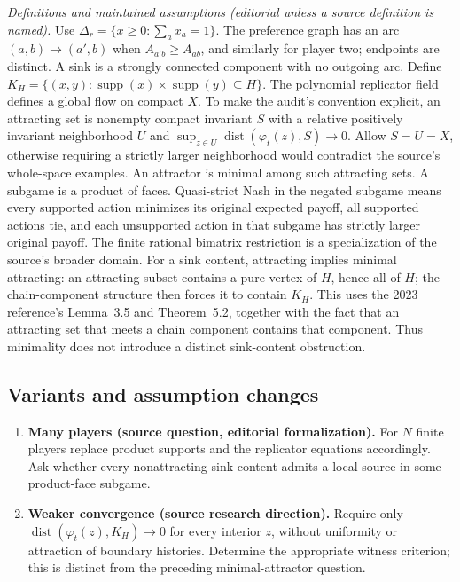 \documentclass[11pt,a4paper]{article}
\begin{document}
\emph{Definitions and maintained assumptions (editorial unless a source definition is named).} Use \(\Delta_r=\{x\ge0:\sum_a x_a=1\}\). The preference graph has an arc \((a,b)\to(a',b)\) when \(A_{a'b}\ge A_{ab}\), and similarly for player two; endpoints are distinct. A sink is a strongly connected component with no outgoing arc. Define \(K_H=\{(x,y):\operatorname{supp}(x)\times\operatorname{supp}(y)\subseteq H\}\). The polynomial replicator field defines a global flow on compact \(X\). To make the audit’s convention explicit, an attracting set is nonempty compact invariant \(S\) with a relative positively invariant neighborhood \(U\) and \(\sup_{z\in U}\operatorname{dist}(\varphi_t(z),S)\to0\). Allow \(S=U=X\), otherwise requiring a strictly larger neighborhood would contradict the source’s whole-space examples. An attractor is minimal among such attracting sets. A subgame is a product of faces. Quasi-strict Nash in the negated subgame means every supported action minimizes its original expected payoff, all supported actions tie, and each unsupported action in that subgame has strictly larger original payoff. The finite rational bimatrix restriction is a specialization of the source’s broader domain. For a sink content, attracting implies minimal attracting: an attracting subset contains a pure vertex of \(H\), hence all of \(H\); the chain-component structure then forces it to contain \(K_H\). This uses the 2023 reference's Lemma~3.5 and Theorem~5.2, together with the fact that an attracting set that meets a chain component contains that component. Thus minimality does not introduce a distinct sink-content obstruction.
\subsection*{Variants and assumption changes}
\begin{enumerate}
\item \textbf{Many players (source question, editorial formalization).} For \(N\) finite players replace product supports and the replicator equations accordingly. Ask whether every nonattracting sink content admits a local source in some product-face subgame.
\item \textbf{Weaker convergence (source research direction).} Require only \(\operatorname{dist}(\varphi_t(z),K_H)\to0\) for every interior \(z\), without uniformity or attraction of boundary histories. Determine the appropriate witness criterion; this is distinct from the preceding minimal-attractor question.
\end{enumerate}
\end{document}
